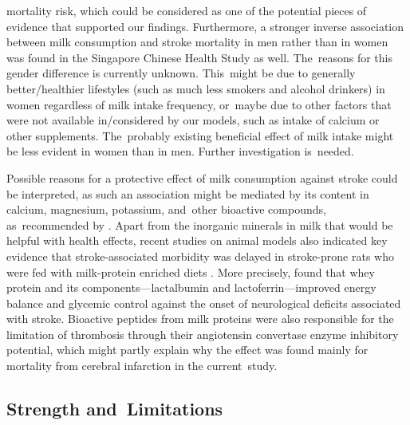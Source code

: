 \documentclass[nutrients,article,accept,moreauthors,pdftex]{Definitions/mdpi}
\begin{document}
mortality risk, which could be considered as one of the potential
pieces of evidence that supported our findings. Furthermore, a stronger inverse
association between milk consumption and stroke mortality in men rather
than in women was found in the Singapore Chinese Health Study
\citep{Talaei_2016} as well. The~reasons for this gender difference is
currently unknown. This~might be due to generally better/healthier
lifestyles (such as much less smokers and alcohol drinkers) in women
regardless of milk intake frequency, or~maybe due to other factors that
were not available in/considered by our models, such as intake of calcium
or other supplements. The~probably existing beneficial effect of milk
intake might be less evident in women than in men. Further
investigation is~needed.

Possible reasons for a protective effect of milk consumption against
stroke could be interpreted, as such an association might be mediated by
its content in calcium, magnesium, potassium, and~other bioactive
compounds, as~recommended by \citet{Iacoviello2018}. Apart from the
inorganic minerals in milk that would be helpful with health effects,
recent studies on animal models also indicated key evidence that
stroke-associated morbidity was delayed in stroke-prone rats who were
fed with milk-protein enriched diets \citep{Chiba2012, singh2016diets}.
More precisely, \citet{Singh2020} found that whey protein and its
components---lactalbumin and lactoferrin---improved energy balance and
glycemic control against the onset of neurological deficits associated
with stroke. Bioactive peptides from milk proteins were also responsible
for the limitation of thrombosis \citep{tokajuk2019whey} through their
angiotensin convertase enzyme inhibitory potential, which might partly
explain why the effect was found mainly for mortality from cerebral
infarction in the current~study.

\hypertarget{strength-and-limitations}{%
\subsection*{Strength and~Limitations}\label{strength-and-limitations}}
\end{document}
